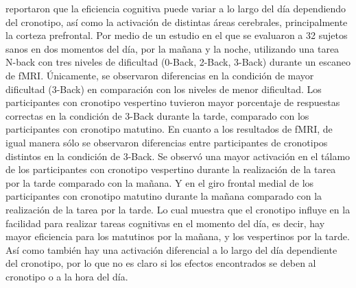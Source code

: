 \documentclass[12pt,letterpaper,final]{article}
\begin{document}
 reportaron que la eficiencia cognitiva puede variar a lo largo del día dependiendo del cronotipo, así como la activación de distintas áreas cerebrales, principalmente la corteza prefrontal. Por medio de un estudio en el que se evaluaron a 32 sujetos sanos en dos momentos del día, por la mañana y la noche, utilizando una tarea N-back  con tres niveles de dificultad (0-Back, 2-Back, 3-Back) durante un escaneo de fMRI. Únicamente, se observaron diferencias en la condición de mayor dificultad (3-Back) en comparación con los niveles de menor dificultad.
Los participantes con cronotipo vespertino tuvieron mayor porcentaje de respuestas correctas en la condición de 3-Back durante la tarde, comparado con los participantes con cronotipo matutino.
En cuanto a los resultados de fMRI, de igual manera sólo se observaron diferencias  entre participantes de cronotipos distintos en la condición de 3-Back. Se observó una mayor activación en el tálamo de los participantes con cronotipo vespertino durante la realización de la tarea por la tarde comparado con la mañana. Y en el giro frontal medial de los participantes con cronotipo matutino durante la mañana comparado con la realización de la tarea por la tarde. Lo cual muestra que el cronotipo influye en la  facilidad para realizar tareas cognitivas en el momento del día, es decir, hay mayor eficiencia para los matutinos por la mañana, y los vespertinos por la tarde. Así como también hay una activación diferencial a lo largo del día dependiente del cronotipo, por lo que no es claro si los efectos encontrados se deben al cronotipo o a la hora del día.


\end{document}

